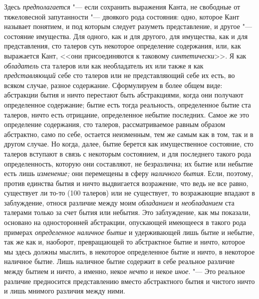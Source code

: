 Здесь {\em предполагается} "--- если сохранить выражения Канта, не свободные от
тяжеловесной запутанности "--- двоякого рода состояния: одно, которое Кант
называет понятием, и под которым следует разуметь представление, и другое "---
состояние имущества. Для одного, как и для другого, для имущества, как и для
представления, сто талеров суть некоторое определение содержания, или, как
выражается Кант, <<они присоединяются к таковому {\em синтетически}>>. Я как
{\em обладатель} ста талеров или как необладатель их или также я как {\em
представляющий} себе сто талеров или не представляющий себе их есть, во всяком
случае, разное содержание. Сформулируем в более общем виде: абстракции бытия и
ничто перестают быть абстракциями, когда они получают определенное содержание;
бытие есть тогда реальность, определенное бытие ста талеров, ничто есть
отрицание, определенное небытие последних. Самое же это определение содержания,
сто талеров, рассматриваемое равным образом абстрактно, само по себе, остается
неизменным, тем же самым как в том, так и в другом случае. Но когда, далее,
бытие берется как имущественное состояние, сто талеров вступают в связь с
некоторым состоянием, и для последнего такого рода определенность, которую они
составляют, не безразлична; их бытие или небытие есть лишь {\em изменение;} они
перемещены в сферу {\em наличного бытия}. Если, поэтому, против единства бытия
и ничто выдвигается возражение, что ведь не все равно, существует ли то-то (100
талеров) или не существует, то возражающие впадают в заблуждение, относя
различие между моим {\em обладанием} и {\em необладанием} ста талерами только
за счет бытия или небытия. Это заблуждение, как мы показали, основано на
односторонней абстракции, опускающей имеющееся в такого рода примерах {\em
определенное наличное бытие} и удерживающей лишь бытие и небытие, так же как и,
наоборот, превращающей то абстрактное бытие и ничто, которое мы здесь должны
мыслить, в некоторое определенное бытие и ничто, в некоторое наличное бытие.
Лишь наличное бытие содержит в себе реальное различие между бытием и ничто, а
именно, некое {\em нечто} и некое {\em иное}. "--- Это реальное различие
предносится представлению вместо абстрактного бытия и чистого ничто и лишь
мнимого различия между ними.

